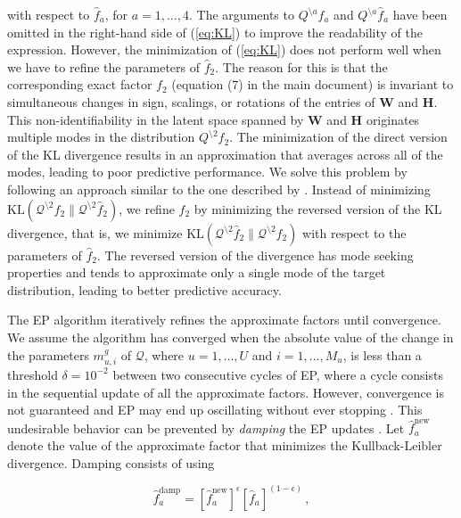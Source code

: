 with respect to $\hat{f}_a$, for $a = 1,\ldots,4$.
The arguments to $Q^{\setminus a}f_a $ and 
$Q^{\setminus a}\hat{f}_a$ have been omitted in the 
right-hand side of (\ref{eq:KL}) to improve the readability of the expression.
However, the minimization of (\ref{eq:KL}) does not perform well when we have to refine the parameters of $\hat{f}_2$.
The reason for this is that the corresponding exact factor $f_2$ (equation (7) in the main document)
is invariant to simultaneous changes in sign, scalings, or rotations of the entries of $\mathbf{W}$ and $\mathbf{H}$.
This non-identifiability in the latent space spanned by $\mathbf{W}$ and $\mathbf{H}$
originates multiple modes in the distribution $Q^{\setminus 2}f_2$.
The minimization of the direct version of the KL divergence results in an approximation that averages across all
of the modes, leading to poor predictive performance.
We solve this problem by following an approach similar to the one described by \cite{stern2009}.
Instead of minimizing $\text{KL}(\mathcal{Q}^{\setminus 2} f_2 \| \mathcal{Q}^{\setminus 2} \hat{f}_2)$,
we refine $\hat{f}_2$ by minimizing the reversed version of the KL divergence, that is,
we minimize $\text{KL}(\mathcal{Q}^{\setminus 2} \hat{f}_2 \| \mathcal{Q}^{\setminus 2} f_2)$ with respect to the parameters of $\hat{f}_2$.
The reversed version of the divergence has mode seeking properties \citep{Bishop2007} and tends to approximate
only a single mode of the target distribution, leading to better predictive accuracy.

The EP algorithm iteratively refines the approximate factors until convergence.
We assume the algorithm has converged when the absolute value of the change in the parameters
$m_{u,i}^g$ of $\mathcal{Q}$, where $u = 1,\ldots,U$ and $i = 1,\ldots,M_u$,
is less than a threshold $\delta = 10^{-2}$ between two consecutive cycles of EP,
where a cycle consists in the sequential update of all the approximate factors.
However, convergence is not guaranteed and
EP may end up oscillating without ever stopping \citep{Minka2001}.
This undesirable behavior can be prevented by \emph{damping} the EP updates \citep{Minka2002}.
Let $\hat{f}_a^\text{new}$ denote the value of the approximate factor that minimizes the Kullback-Leibler
divergence. Damping consists of using

\begin{equation}
\hat{f}_a^\text{damp} = \left[ \hat{f}_a^\text{new} \right]^\epsilon \left[ \hat{f}_a \right]^{(1 - \epsilon)}\,,\label{eq:damping}
\end{equation}


